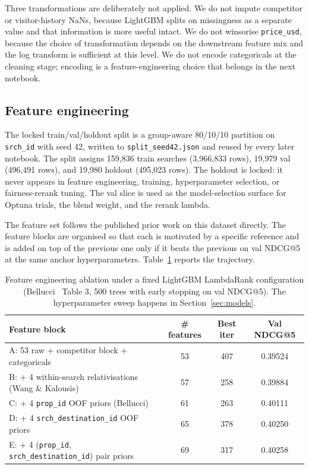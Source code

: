 \documentclass[runningheads]{llncs}
\begin{document}
Three transformations are deliberately not applied. We do not impute competitor or visitor-history NaNs, because LightGBM splits on missingness as a separate value and that information is more useful intact. We do not winsorise \texttt{price\_usd}, because the choice of transformation depends on the downstream feature mix and the log transform is sufficient at this level. We do not encode categoricals at the cleaning stage; encoding is a feature-engineering choice that belongs in the next notebook.

\subsection{Feature engineering}\label{subsec:feat}

The locked train/val/holdout split is a group-aware 80/10/10 partition on \texttt{srch\_id} with seed 42, written to \texttt{split\_seed42.json} and reused by every later notebook. The split assigns 159{,}836 train searches (3{,}966{,}833 rows), 19{,}979 val (496{,}491 rows), and 19{,}980 holdout (495{,}023 rows). The holdout is locked: it never appears in feature engineering, training, hyperparameter selection, or fairness-rerank tuning. The val slice is used as the model-selection surface for Optuna trials, the blend weight, and the rerank lambda.

The feature set follows the published prior work on this dataset directly. The feature blocks are organised so that each is motivated by a specific reference and is added on top of the previous one only if it beats the previous on val NDCG@5 at the same anchor hyperparameters. Table~\ref{tab:fe} reports the trajectory.

\begin{table}[t]
\centering
\caption{Feature engineering ablation under a fixed LightGBM LambdaRank configuration (Bellucci~\cite{bellucci2021dmt} Table 3, 500 trees with early stopping on val NDCG@5). The hyperparameter sweep happens in Section~\ref{sec:models}.}
\label{tab:fe}
\begin{tabular}{lccc}
\toprule
Feature block & \# features & Best iter & Val NDCG@5 \\
\midrule
A: 53 raw + competitor block + categoricals & 53 & 407 & 0.39524 \\
B: + 4 within-search relativisations (Wang \& Kalousis) & 57 & 258 & 0.39884 \\
C: + 4 \texttt{prop\_id} OOF priors (Bellucci) & 61 & 263 & 0.40111 \\
D: + 4 \texttt{srch\_destination\_id} OOF priors & 65 & 378 & 0.40250 \\
E: + 4 (\texttt{prop\_id}, \texttt{srch\_destination\_id}) pair priors & 69 & 317 & 0.40258 \\
\bottomrule
\end{tabular}
\end{table}
\end{document}
